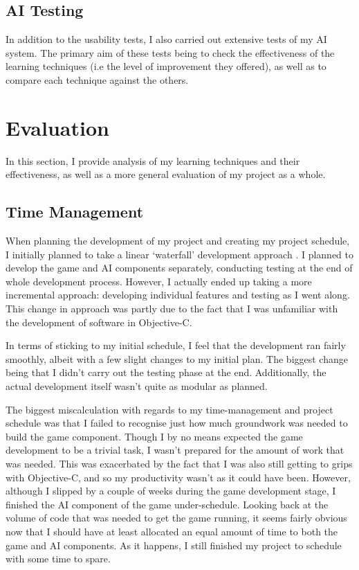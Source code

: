 \documentclass[a4paper,oneside]{report}
\begin{document}
\section{AI Testing}

In addition to the usability tests, I also carried out extensive tests of my AI system. The primary aim of these tests being to check the effectiveness of the learning techniques (i.e the level of improvement they offered), as well as to compare each technique against the others.



%
%

\chapter{Evaluation}

In this section, I provide analysis of my learning techniques and their effectiveness, as well as a more general evaluation of my project as a whole.

\section{Time Management}

When planning the development of my project and creating my project schedule, I initially planned to take a linear `waterfall' development approach \cite{Rerych:gb}. I planned to develop the game and AI components separately, conducting testing at the end of whole development process. However, I actually ended up taking a more incremental approach: developing individual features and testing as I went along. This change in approach was partly due to the fact that I was unfamiliar with the development of software in Objective-C.

In terms of sticking to my initial schedule, I feel that the development ran fairly smoothly, albeit with a few slight changes to my initial plan. The biggest change being that I didn't carry out the testing phase at the end. Additionally, the actual development itself wasn't quite as modular as planned.

The biggest miscalculation with regards to my time-management and project schedule was that I failed to recognise just how much groundwork was needed to build the game component. Though I by no means expected the game development to be a trivial task, I wasn't prepared for the amount of work that was needed. This was exacerbated by the fact that I was also still getting to grips with Objective-C, and so my productivity wasn't as it could have been. However, although I slipped by a couple of weeks during the game development stage, I finished the AI component of the game under-schedule. Looking back at the volume of code that was needed to get the game running, it seems fairly obvious now that I should have at least allocated an equal amount of time to both the game and AI components. As it happens, I still finished my project to schedule with some time to spare.
\end{document}
